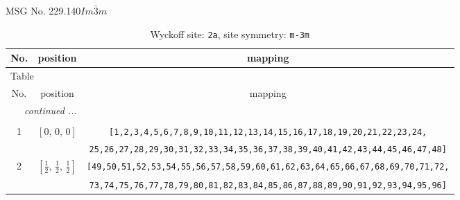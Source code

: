 \documentclass[fleqn,8pt]{jsarticle}
\begin{document}
\setcounter{MaxMatrixCols}{32}

\renewcommand{\tablename}{Table~}
\renewcommand{\figurename}{Figure~}
\begin{center}
\LARGE
MSG No. 229.140\quad$Im\bar{3}m$
\end{center}
\renewcommand{\arraystretch}{1.2}
\begin{longtable}{ccc}
\caption{Wyckoff site: {\tt 2a}, site symmetry: {\tt m-3m}}
 \\
 \hline \hline
No. & position & mapping \\ \hline \endfirsthead

\multicolumn{2}{l}{\tablename\ \thetable{}} \\
 \hline \hline
No. & position & mapping \\ \hline \endhead

 \hline \hline
\multicolumn{2}{r}{\footnotesize\it continued ...} \\ \endfoot

 \hline \hline
\multicolumn{2}{r}{} \\ \endlastfoot

1 & $\left[ 0,\, 0,\, 0 \right]$ & {\tt [1,2,3,4,5,6,7,8,9,10,11,12,13,14,15,16,17,18,19,20,21,22,23,24,} \\ \hline
 &  & {\tt 25,26,27,28,29,30,31,32,33,34,35,36,37,38,39,40,41,42,43,44,45,46,47,48]} \\ \hline
2 & $\left[ \frac{1}{2},\, \frac{1}{2},\, \frac{1}{2} \right]$ & {\tt [49,50,51,52,53,54,55,56,57,58,59,60,61,62,63,64,65,66,67,68,69,70,71,72,} \\ \hline
 &  & {\tt 73,74,75,76,77,78,79,80,81,82,83,84,85,86,87,88,89,90,91,92,93,94,95,96]} \\
\end{longtable}
\renewcommand{\arraystretch}{1.2}
\end{document}
